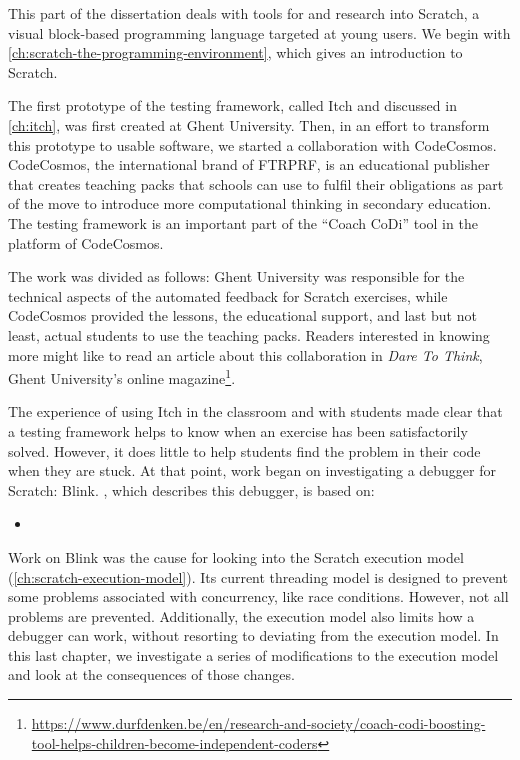 \documentclass[./main]{subfiles}
\begin{document}
\label{ch:preface-2}

This part of the dissertation deals with tools for and research into Scratch, a visual block-based programming language targeted at young users.
We begin with \cref{ch:scratch-the-programming-environment}, which gives an introduction to Scratch.

The first prototype of the testing framework, called Itch and discussed in \cref{ch:itch}, was first created at Ghent University.
Then, in an effort to transform this prototype to usable software, we started a collaboration with CodeCosmos.
CodeCosmos, the international brand of FTRPRF, is an educational publisher that creates teaching packs that schools can use to fulfil their obligations as part of the move to introduce more computational thinking in secondary education.
The testing framework is an important part of the ``Coach CoDi'' tool in the platform of CodeCosmos.

The work was divided as follows: Ghent University was responsible for the technical aspects of the automated feedback for Scratch exercises, while CodeCosmos provided the lessons, the educational support, and last but not least, actual students to use the teaching packs.
Readers interested in knowing more might like to read an article about this collaboration in \textit{Dare To Think}, Ghent University's online magazine\footnote{\url{https://www.durfdenken.be/en/research-and-society/coach-codi-boosting-tool-helps-children-become-independent-coders}}.

The experience of using Itch in the classroom and with students made clear that a testing framework helps to know when an exercise has been satisfactorily solved.
However, it does little to help students find the problem in their code when they are stuck.
At that point, work began on investigating a debugger for Scratch: Blink.
, which describes this debugger, is based on:

\begin{itemize}
    \item {}
\end{itemize}

Work on Blink was the cause for looking into the Scratch execution model (\cref{ch:scratch-execution-model}).
Its current threading model is designed to prevent some problems associated with concurrency, like race conditions.
However, not all problems are prevented.
Additionally, the execution model also limits how a debugger can work, without resorting to deviating from the execution model.
In this last chapter, we investigate a series of modifications to the execution model and look at the consequences of those changes.
\end{document}
